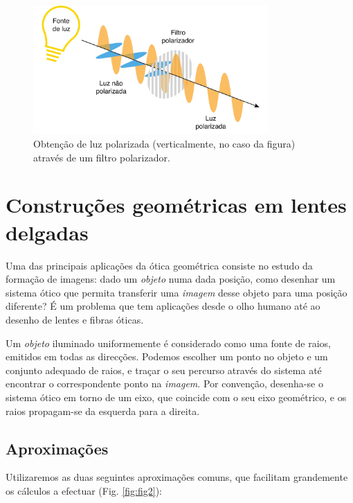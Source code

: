 \documentclass[12pt,a4paper,oneside]{paper}
\begin{document}
\begin{figure}[H]
\centering 
	\includegraphics[width=0.8\textwidth]{./otica_images/2-pol-luz}
	\caption{Obtenção de luz polarizada (verticalmente, no caso da figura) através de um filtro polarizador. \label{fig:pol-luz}} 
\end{figure}






\section{\sf Construções geométricas em lentes delgadas}

Uma das principais aplicações da ótica geométrica consiste no estudo da formação de imagens: dado um \emph{objeto} numa
dada posição, como desenhar um sistema ótico que permita transferir uma \emph{imagem} desse objeto para uma posição diferente?
É um problema que tem aplicações desde o olho humano até ao desenho de lentes e fibras óticas.

 Um \emph{objeto} iluminado uniformemente é considerado como uma fonte de raios, emitidos em todas as direcções. Podemos
 escolher um ponto no objeto e um conjunto adequado de raios, e traçar o seu percurso através do sistema até encontrar o
 correspondente ponto na \emph{imagem}. Por convenção, desenha-se o sistema ótico em torno de um eixo, que coincide com
 o seu eixo geométrico, e os raios propagam-se da esquerda para a direita. 



\subsection{\sf Aproximações}
Utilizaremos as duas seguintes aproximações comuns, que facilitam grandemente os cálculos a efectuar (Fig. \ref{fig:fig2}):
\end{document}
